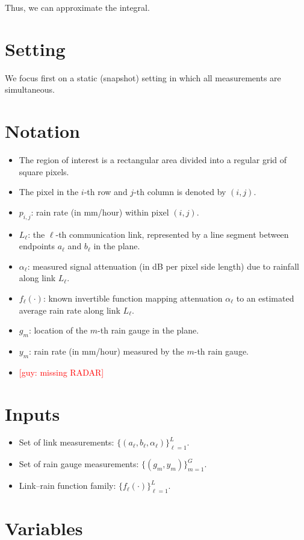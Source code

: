 \documentclass[12pt]{article}
\newcommand{\guy}[1]{\textcolor{red}{[guy: #1]}}
\begin{document}
Thus, we can approximate the integral.
\section*{Setting}
We focus first on a static (snapshot) setting in which all measurements are simultaneous.
\section*{Notation}

\begin{itemize}
    \item The region of interest is a rectangular area divided into a regular grid of square pixels.
    \item The pixel in the $i$-th row and $j$-th column is denoted by $(i,j)$.
    \item $p_{i,j}$: rain rate (in mm/hour) within pixel $(i,j)$.
    \item $L_\ell$: the $\ell$-th communication link, represented by a line segment between endpoints $a_\ell$ and $b_\ell$ in the plane.
    \item $\alpha_\ell$: measured signal attenuation (in dB per pixel side length) due to rainfall along link $L_\ell$.
    \item $f_\ell(\cdot)$: known invertible function mapping attenuation $\alpha_\ell$ to an estimated average rain rate along link $L_\ell$.
    \item $g_m$: location of the $m$-th rain gauge in the plane.
    \item $y_m$: rain rate (in mm/hour) measured by the $m$-th rain gauge.
    \item \guy{missing RADAR}
\end{itemize}

\section*{Inputs}

\begin{itemize}
    \item Set of link measurements: $\{(a_\ell, b_\ell, \alpha_\ell)\}_{\ell=1}^L$.
    \item Set of rain gauge measurements: $\{(g_m, y_m)\}_{m=1}^G$.
    \item Link--rain function family: $\{f_\ell(\cdot)\}_{\ell=1}^L$.
\end{itemize}

\section*{Variables}
\end{document}
